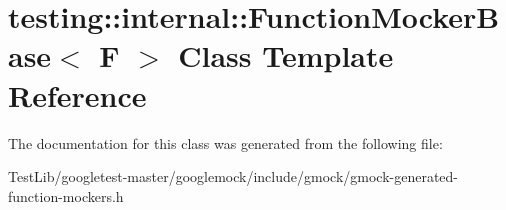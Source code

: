 \hypertarget{classtesting_1_1internal_1_1FunctionMockerBase}{}\section{testing\+:\+:internal\+:\+:Function\+Mocker\+Base$<$ F $>$ Class Template Reference}
\label{classtesting_1_1internal_1_1FunctionMockerBase}


The documentation for this class was generated from the following file\+:\begin{DoxyCompactItemize}
\item 
Test\+Lib/googletest-\/master/googlemock/include/gmock/gmock-\/generated-\/function-\/mockers.\+h\end{DoxyCompactItemize}

